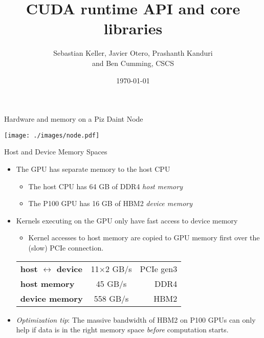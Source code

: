 \documentclass[aspectratio=43]{beamer}
\author{Sebastian Keller, Javier Otero, Prashanth Kanduri\\ and Ben Cumming, CSCS}
\title{CUDA runtime API and core libraries}
\subtitle{}
\date{\today}
\begin{document}
\cscstitle

\begin{frame}[fragile]{Hardware and memory on a Piz Daint Node}
    \begin{center}
        \texttt{[image: ./images/node.pdf]}
    \end{center}
\end{frame}

\begin{frame}[fragile]{Host and Device Memory Spaces}
    \begin{itemize}
        \item The GPU has separate memory to the host CPU
            \begin{itemize}
                \item The host CPU has 64 GB of DDR4 \emph{host memory}
                \item The P100 GPU has 16 GB of HBM2 \emph{device memory}
            \end{itemize}
        \item Kernels executing on the GPU only have fast access to device memory
            \begin{itemize}
                \item Kernel accesses to host memory are copied to GPU memory first over the (slow) PCIe connection.
            \end{itemize}

            \begin{center}
                \begin{tabular}{lcr}
                    \textbf{host $\leftrightarrow$ device} & 11$\times$2 GB/s & PCIe gen3 \\
                    \textbf{host memory}                   & 45 GB/s  & DDR4      \\
                    \textbf{device memory}                 & 558 GB/s & HBM2
                \end{tabular}
            \end{center}

        \item \emph{Optimization tip}: The massive bandwidth of HBM2 on P100 GPUs can only help if data is in the right memory space \emph{before} computation starts.
    \end{itemize}

\end{frame}
\end{document}
